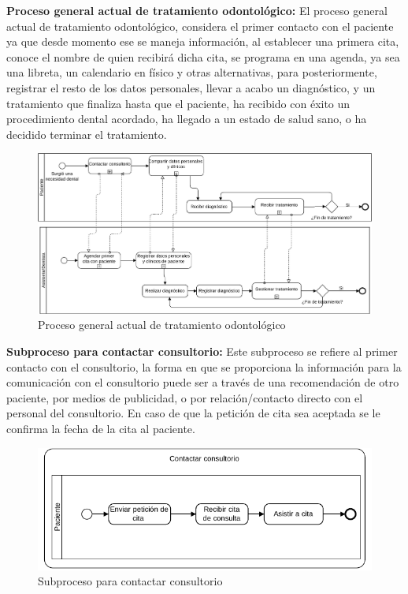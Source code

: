 \noindent\textbf{Proceso general actual de tratamiento odontológico:} El proceso general actual de tratamiento odontológico, considera el primer contacto con el paciente ya que desde momento ese se maneja información, al establecer una primera cita, conoce el nombre de quien recibirá dicha cita, se programa en una agenda, ya sea una libreta, un calendario en físico y otras alternativas, para posteriormente, registrar el resto de los datos personales, llevar a acabo un diagnóstico, y un tratamiento que finaliza hasta que el paciente, ha recibido con éxito un procedimiento dental acordado, ha llegado a un estado de salud sano, o ha decidido terminar el tratamiento.

\begin{figure}[H]
\centerline{\includegraphics[width=18.5cm, keepaspectratio]{pictures/picture05.pdf}}
\caption{Proceso general actual de tratamiento odontológico}
\end{figure}

\noindent\textbf{Subproceso para contactar consultorio:} Este subproceso se refiere al primer contacto con el consultorio, la forma en que se proporciona la información para la comunicación con el consultorio puede ser a través de una recomendación de otro paciente, por medios de publicidad, o por relación/contacto directo con el personal del consultorio. En caso de que la petición de cita sea aceptada se le confirma la fecha de la cita al paciente.

\begin{figure}[H]
\centering
\centerline{ \includegraphics[width=12cm, keepaspectratio]{pictures/picture04.pdf}}
\caption{Subproceso para contactar consultorio}
\end{figure}

